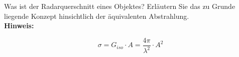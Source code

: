 \begin{question}[section=12,name={Radarquerschnitt},difficulty=,quantity=1,type=thr,tags={20151210,20131210}]
	Was ist der Radarquerschnitt eines Objektes? Erläutern Sie das zu Grunde liegende Konzept hinsichtlich der äquivalenten Abstrahlung.
	\\ \textbf{Hinweis:}\\
	
\end{question}
\begin{solution}
	\begin{equation}
		\sigma = G_{iso} \cdot A = \frac{4 \pi}{\lambda^2} \cdot A^2
	\end{equation}
\end{solution}